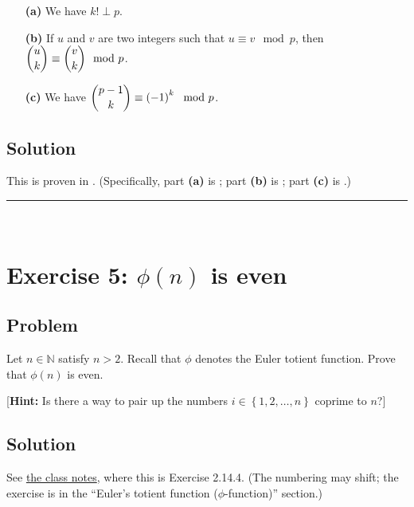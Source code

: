 \documentclass[paper=a4, fontsize=12pt]{scrartcl} %
\newcommand{\NN}{\mathbb{N}} %
\newcommand{\set}[1]{\left\{ #1 \right\}}
\newcommand{\tup}[1]{\left( #1 \right)}
\newcommand{\horrule}[1]{\rule{\linewidth}{#1}} %
\theoremstyle{plainsl}
\theoremstyle{definition}
\theoremstyle{remark}
\begin{document}
\begin{enumerate}

\item[\textbf{(a)}]
We have $k! \perp p$.

\item[\textbf{(b)}]
If $u$ and $v$ are two integers such that $u \equiv v \mod p$,
then
$\dbinom{u}{k} \equiv \dbinom{v}{k} \mod p$.

\item[\textbf{(c)}]
We have $\dbinom{p-1}{k} \equiv \tup{-1}^k \mod p$.

\end{enumerate}

\subsection{Solution}

This is proven in \cite[Section 5]{fleck}.
(Specifically, part \textbf{(a)} is \cite[Lemma 5.2]{fleck};
part \textbf{(b)} is \cite[Proposition 5.5]{fleck};
part \textbf{(c)} is \cite[Proposition 3.1]{fleck}.)

\horrule{0.3pt} \\[0.4cm]

\section{Exercise 5: $\phi\tup{n}$ is even}

\subsection{Problem}

Let $n \in \NN$ satisfy $n > 2$.
Recall that $\phi$ denotes the Euler totient function.
Prove that $\phi\tup{n}$ is even.

[\textbf{Hint:} Is there a way to pair up the numbers
$i \in \set{1, 2, \ldots, n}$ coprime to $n$?]

\subsection{Solution}

See
\href{http://www.cip.ifi.lmu.de/~grinberg/t/19s/notes.pdf}{the class notes},
where this is Exercise 2.14.4.
(The numbering may shift; the exercise is in the
``Euler's totient function ($\phi$-function)''
section.)
\end{document}
